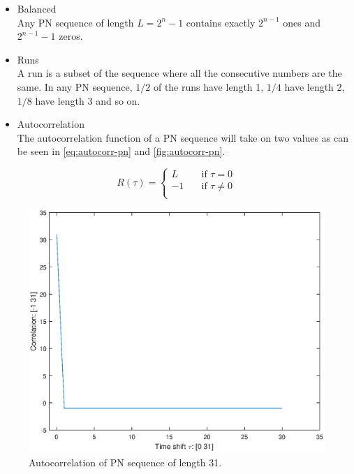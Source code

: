 		\begin{itemize}
			\item Balanced \\
					Any PN sequence of length $L = 2^n - 1$ contains exactly $2^{n-1}$ ones and $2^{n-1} - 1$ zeros.

			\item Runs \\
					A run is a subset of the sequence where all the consecutive numbers are the same.
					In any PN sequence, $1/2$ of the runs have length 1, $1/4$ have length 2, $1/8$ have length 3 and so on.

			\item Autocorrelation \\
					The autocorrelation function of a PN sequence will take on two values as can be seen in \autoref{eq:autocorr-pn} and \autoref{fig:autocorr-pn}.


		\end{itemize}

		\begin{equation}
			\label{eq:autocorr-pn}
			R(\tau) = 
				\begin{cases}
					L    & \quad \text{if } \tau = 0 \\
					-1   & \quad \text{if } \tau \neq 0 \\
				\end{cases}
		\end{equation}

		\begin{figure}
			\centering
			\includegraphics[width=\textwidth]{chapters/CDMA/autocorr-pn.eps}
			\caption{Autocorrelation of PN sequence of length 31.}
			\label{fig:autocorr-pn}
		\end{figure}

